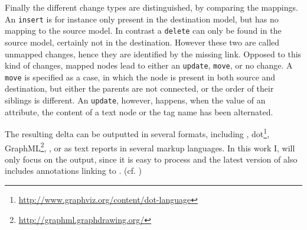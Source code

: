 	Finally the different change types are distinguished, by comparing the mappings. An \texttt{insert} is for instance only present in the destination model, but has no mapping to the source model. In contrast a \texttt{delete} can only be found in the source model, certainly not in the destination.
	However these two are called unmapped changes, hence they are identified by the missing link. Opposed to this kind of changes, mapped nodes lead to either an \texttt{update}, \texttt{move}, or no change.
	A \texttt{move} is specified as a case, in which the node is present in both source and destination, but either the parents are not connected, or the order of their siblings is different. An \texttt{update}, however, happens, when the value of an attribute, the content of a text node or the tag name has been alternated.
	
	The resulting \xml delta can be outputted in several formats, including \xml, dot\footnote{\url{http://www.graphviz.org/content/dot-language}}, GraphML\footnote{\url{http://graphml.graphdrawing.org/}}, \json, or as text reports in several markup languages.
	In this work I, will only focus on the \xml output, since it is easy to process and the latest version of \bives also includes \rdf annotations linking to \comodi.
	(cf. \citealt{Scharm2015})
	
